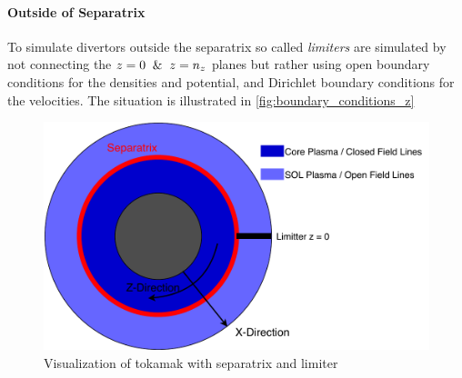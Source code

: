\documentclass[master.tex]{subfiles}
\begin{document}
\paragraph{Outside of Separatrix}
To simulate  divertors outside the separatrix so called \textit{limiters} are simulated by not connecting the $z=0 \And z=n_z$ planes but rather using open boundary conditions for the densities and potential, and Dirichlet boundary conditions for the velocities. The situation is illustrated in \autoref{fig:boundary_conditions_z}
\begin{figure}[ht]
    \centering
    \includegraphics[width=\linewidth]{pdfs/boundary_conditions_z.pdf}
    \caption{Visualization of tokamak with separatrix and limiter}
    \label{fig:boundary_conditions_z}
\end{figure}
\end{document}
